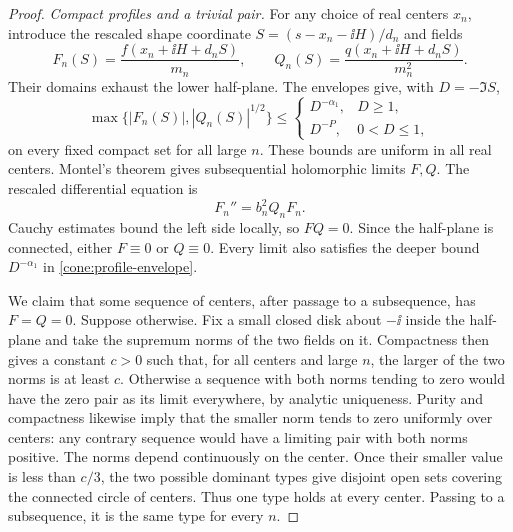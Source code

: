 \begin{proof}
\medskip\noindent
\emph{Compact profiles and a trivial pair.}
For any choice of real centers \(x_n\), introduce the rescaled shape
coordinate \(S=(s-x_n-\ii H)/d_n\) and fields
\begin{equation}\label{cone:superlinear-profiles}
 F_n(S)=\frac{f(x_n+\ii H+d_nS)}{m_n},\qquad
 Q_n(S)=\frac{q(x_n+\ii H+d_nS)}{m_n^2}.
\end{equation}
Their domains exhaust the lower half-plane. The envelopes give,
with \(D=-\Im S\),
\begin{equation}\label{cone:profile-envelope}
 \max\{|F_n(S)|,|Q_n(S)|^{1/2}\}
 \le
 \begin{cases}
 D^{-\alpha_1},&D\ge1,\\
 D^{-P},&0<D\le1,
 \end{cases}
\end{equation}
on every fixed compact set for all large \(n\). These bounds are
uniform in all real centers. Montel's theorem gives subsequential
holomorphic limits \(F,Q\). The rescaled differential equation is
\begin{equation}\label{cone:profile-ode}
 F_n''=b_n^2Q_nF_n.
\end{equation}
Cauchy estimates bound the left side locally, so \(FQ=0\). Since the
half-plane is connected, either \(F\equiv0\) or \(Q\equiv0\).
Every limit also satisfies the deeper bound \(D^{-\alpha_1}\) in
\eqref{cone:profile-envelope}.

We claim that some sequence of centers, after passage to a subsequence,
has \(F=Q=0\). Suppose otherwise. Fix a small closed disk about \(-\ii\)
inside the half-plane and take the supremum norms of the two fields on
it. Compactness then gives a constant \(c>0\) such that, for all centers
and large \(n\), the larger of the two norms is at least \(c\).
Otherwise a sequence with both norms tending to zero would have the
zero pair as its limit everywhere, by analytic uniqueness. Purity and
compactness likewise imply that the smaller norm tends to zero
uniformly over centers: any contrary sequence would have a limiting
pair with both norms positive. The norms depend continuously on the
center. Once their smaller value is less than \(c/3\), the two
possible dominant types give disjoint open sets covering the connected
circle of centers. Thus one type holds at every center. Passing to a
subsequence, it is the same type for every \(n\).


\end{proof}
